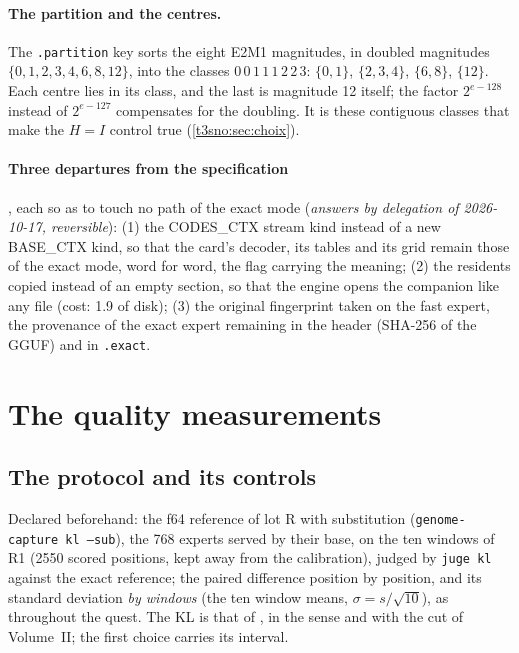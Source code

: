 \paragraph{The partition and the centres.} The \texttt{.partition} key sorts the eight E2M1 magnitudes, in doubled magnitudes $\{0, 1, 2, 3, 4, 6, 8, 12\}$, into the classes $0\,0\,1\,1\,1\,2\,2\,3$: $\{0, 1\}$, $\{2, 3, 4\}$, $\{6, 8\}$, $\{12\}$. Each centre lies in its class, and the last is magnitude 12 itself; the factor $2^{e-128}$ instead of $2^{e-127}$ compensates for the doubling. It is these contiguous classes that make the $H = I$ control true (\cref{t3sno:sec:choix}).

\paragraph{Three departures from the specification}, each so as to touch no path of the exact mode (\emph{answers by delegation of 2026-10-17, reversible}): (1) the CODES\_CTX stream kind instead of a new BASE\_CTX kind, so that the card's decoder, its tables and its grid remain those of the exact mode, word for word, the flag carrying the meaning; (2) the residents copied instead of an empty section, so that the engine opens the companion like any file (cost: \SI{1.9}{\Go} of disk); (3) the original fingerprint taken on the fast expert, the provenance of the exact expert remaining in the header (SHA-256 of the GGUF) and in \texttt{.exact}.

\section{The quality measurements}\label{t3sno:sec:mesures}

\subsection{The protocol and its controls}\label{t3sno:sec:protocole}

Declared beforehand: the f64 reference of lot R with substitution (\texttt{genome-capture kl --sub}), the 768 experts served by their base, on the ten windows of R1 (\num{2550} scored positions, kept away from the calibration), judged by \texttt{juge kl} against the exact reference; the paired difference position by position, and its standard deviation \emph{by windows} (the ten window means, $\sigma = s/\sqrt{10}$), as throughout the quest. The KL is that of \textcite{kullback1951}, in the sense and with the cut of Volume~II; the first choice carries its \textcite{wilson1927} interval.

